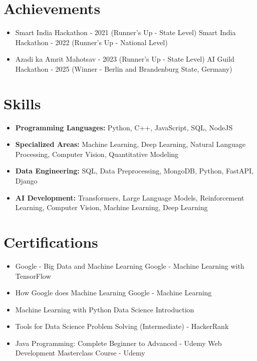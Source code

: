 \documentclass[a4paper,10pt]{article}
\begin{document}
\section*{Achievements}
\begin{itemize}
\item Smart India Hackathon - 2021 (Runner's Up - State Level) \hfill Smart India Hackathon - 2022 (Runner's Up - National Level)
\item Azadi ka Amrit Mahotsav - 2023 (Runner's Up - State Level) \hfill AI Guild Hackathon - 2025 (Winner - Berlin and Brandenburg State, Germany)
\end{itemize}

\section*{Skills}
\begin{itemize}
  \item \textbf{Programming Languages:} Python, C++, JavaScript, SQL, NodeJS
  \item \textbf{Specialized Areas:} Machine Learning, Deep Learning, Natural Language Processing, Computer Vision, Quantitative Modeling
  \item \textbf{Data Engineering:} SQL, Data Preprocessing, MongoDB, Python, FastAPI, Django
  \item \textbf{AI Development:} Transformers, Large Language Models, Reinforcement Learning, Computer Vision, Machine Learning, Deep Learning
\end{itemize}

\section*{Certifications}
\begin{itemize}
\item Google - Big Data and Machine Learning \hfill Google - Machine Learning with TensorFlow
\item How Google does Machine Learning \hfill Google - Machine Learning
\item Machine Learning with Python \hfill Data Science Introduction
\item Tools for Data Science \hfill Problem Solving (Intermediate) - HackerRank
\item Java Programming: Complete Beginner to Advanced - Udemy \hfill Web Development Masterclass Course - Udemy
\end{itemize}
\end{document}
